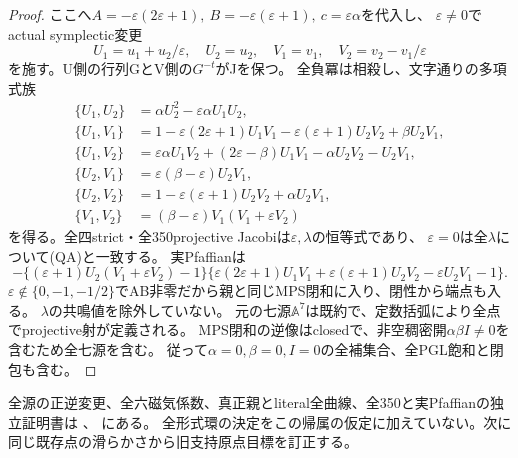 \documentclass[a4paper,11pt]{ltjsarticle}
\theoremstyle{definition}
\begin{document}
\begin{proof}
ここへ$A=-\varepsilon(2\varepsilon+1),\ B=-\varepsilon(\varepsilon+1),\ c=\varepsilon\alpha$を代入し、
$\varepsilon\ne0$でactual symplectic変更
\[
 U_1=u_1+u_2/\varepsilon,\quad U_2=u_2,\quad
 V_1=v_1,\quad V_2=v_2-v_1/\varepsilon
\]
を施す。U側の行列GとV側の$G^{-t}$がJを保つ。
全負冪は相殺し、文字通りの多項式族
\[
\begin{aligned}
 \{U_1,U_2\}&=\alpha U_2^2-\varepsilon\alpha U_1U_2,\\
 \{U_1,V_1\}&=1-\varepsilon(2\varepsilon+1)U_1V_1-\varepsilon(\varepsilon+1)U_2V_2+\beta U_2V_1,\\
 \{U_1,V_2\}&=\varepsilon\alpha U_1V_2+(2\varepsilon-\beta)U_1V_1-\alpha U_2V_2-U_2V_1,\\
 \{U_2,V_1\}&=\varepsilon(\beta-\varepsilon)U_2V_1,\\
 \{U_2,V_2\}&=1-\varepsilon(\varepsilon+1)U_2V_2+\alpha U_2V_1,\\
 \{V_1,V_2\}&=(\beta-\varepsilon)V_1(V_1+\varepsilon V_2)
\end{aligned}
\]
を得る。全四strict・全350projective Jacobiは$\varepsilon,\lambda$の恒等式であり、
$\varepsilon=0$は全$\lambda$について(QA)と一致する。
実Pfaffianは
\[
 -\{(\varepsilon+1)U_2(V_1+\varepsilon V_2)-1\}
 \{\varepsilon(2\varepsilon+1)U_1V_1+\varepsilon(\varepsilon+1)U_2V_2-\varepsilon U_2V_1-1\}.
\]
$\varepsilon\notin\{0,-1,-1/2\}$でAB非零だから親と同じMPS閉和に入り、閉性から端点も入る。
$\lambda$の共鳴値を除外していない。
元の七源$\mathbb A^7$は既約で、定数括弧により全点でprojective射が定義される。
MPS閉和の逆像はclosedで、非空稠密開$\alpha\beta I\ne0$を含むため全七源を含む。
従って$\alpha=0,\beta=0,I=0$の全補集合、全PGL飽和と閉包も含む。
\end{proof}
全源の正逆変更、全六磁気係数、真正親とliteral全曲線、全350と実Pfaffianの独立証明書は
、
にある。
全形式環の決定をこの帰属の仮定に加えていない。次に同じ既存点の滑らかさから旧支持原点目標を訂正する。
\end{document}
